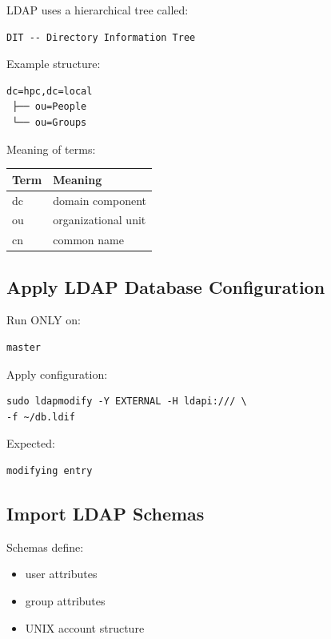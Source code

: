\documentclass[11pt]{article}
\begin{document}
LDAP uses a hierarchical tree called:

\begin{verbatim}
DIT -- Directory Information Tree
\end{verbatim}

Example structure:

\begin{verbatim}
dc=hpc,dc=local
 ├── ou=People
 └── ou=Groups
\end{verbatim}

Meaning of terms:

\begin{center}
\begin{tabular}{ll}
Term & Meaning\\
\hline
dc & domain component\\
ou & organizational unit\\
cn & common name\\
\end{tabular}
\end{center}
\subsection{Apply LDAP Database Configuration}
\label{sec:org0314200}

Run ONLY on:

\begin{verbatim}
master
\end{verbatim}

Apply configuration:

\begin{verbatim}
sudo ldapmodify -Y EXTERNAL -H ldapi:/// \
-f ~/db.ldif
\end{verbatim}

Expected:

\begin{verbatim}
modifying entry
\end{verbatim}
\subsection{Import LDAP Schemas}
\label{sec:org65e2cbf}

Schemas define:

\begin{itemize}
\item user attributes
\item group attributes
\item UNIX account structure
\end{itemize}
\end{document}

